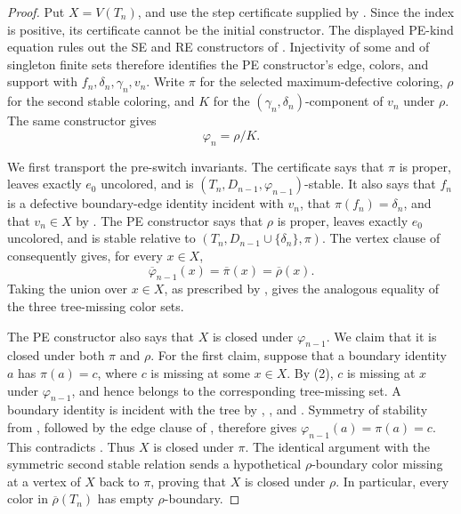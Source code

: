 \begin{proof}
Put \(X=V(T_n)\), and use the step certificate supplied by
.  Since the index is positive, its certificate
cannot be the initial constructor.  The displayed PE-kind equation rules
out the SE and RE constructors of .
Injectivity of \(\mathrm{some}\) and of singleton finite sets therefore
identifies the PE constructor's edge, colors, and support with
\(f_n,\delta_n,\gamma_n,v_n\).  Write \(\pi\) for the selected
maximum-defective coloring, \(\rho\) for the second stable coloring, and
\(K\) for the \((\gamma_n,\delta_n)\)-component of \(v_n\) under
\(\rho\).  The same constructor gives
\[
 \varphi_n=\rho/K.                                                \tag{1}
\]

We first transport the pre-switch invariants.  The certificate
 says that \(\pi\) is proper, leaves
exactly \(e_0\) uncolored, and is
\((T_n,D_{n-1},\varphi_{n-1})\)-stable.  It also says that \(f_n\) is a
defective boundary-edge identity incident with \(v_n\), that
\(\pi(f_n)=\delta_n\), and that \(v_n\in X\) by
.  The PE constructor says that \(\rho\) is
proper, leaves exactly \(e_0\) uncolored, and is stable relative to
\((T_n,D_{n-1}\cup\{\delta_n\},\pi)\).  The vertex clause of
 consequently gives, for every \(x\in X\),
\[
 \overline{\varphi}_{n-1}(x)=\overline\pi(x)=\overline\rho(x).    \tag{2}
\]
Taking the union over \(x\in X\), as prescribed by
, gives the analogous equality of the three
tree-missing color sets.

The PE constructor also says that \(X\) is closed under
\(\varphi_{n-1}\).  We claim that it is closed under both \(\pi\) and
\(\rho\).  For the first claim, suppose that a boundary identity \(a\)
has \(\pi(a)=c\), where \(c\) is missing at some \(x\in X\).  By (2),
\(c\) is missing at \(x\) under \(\varphi_{n-1}\), and hence belongs to
the corresponding tree-missing set.  A boundary identity is incident with
the tree by , , and
.  Symmetry of stability from ,
followed by the edge clause of , therefore gives
\(\varphi_{n-1}(a)=\pi(a)=c\).  This contradicts
.  Thus \(X\) is closed under \(\pi\).
The identical argument with the symmetric second stable relation sends a
hypothetical \(\rho\)-boundary color missing at a vertex of \(X\) back to
\(\pi\), proving that \(X\) is closed under \(\rho\).  In particular,
every color in \(\overline\rho(T_n)\) has empty \(\rho\)-boundary.


\end{proof}
